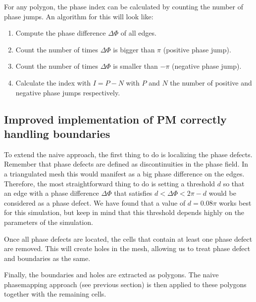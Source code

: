 \documentclass[twocolumn]{article}
\begin{document}
For any polygon, the phase index can be calculated by counting the
number of phase jumps. An algorithm for this will look like:

\begin{enumerate}
    \def\labelenumi{\arabic{enumi}.}
    \tightlist
  \item
    Compute the phase difference \(\Delta\Phi\) of all edges.
  \item
    Count the number of times \(\Delta\Phi\) is bigger than \(\pi\)
    (positive phase jump).
  \item
    Count the number of times \(\Delta\Phi\) is smaller than \(-\pi\)
    (negative phase jump).
  \item
    Calculate the index with \(I = P - N\) with \(P\) and \(N\) the number
    of positive and negative phase jumps respectively.
\end{enumerate}

\subsection{Improved implementation of PM correctly handling boundaries}

To extend the naive approach, the first thing to do is localizing the
phase defects. Remember that phase defects are defined as
discontinuities in the phase field. In a triangulated mesh this would
manifest as a big phase difference on the edges. Therefore, the most
straightforward thing to do is setting a threshold \(d\) so that an edge
with a phase difference \(\Delta\Phi\) that satisfies
\(d<\Delta\Phi<2\pi-d\) would be considered as a phase defect. We have
found that a value of \(d=0.08\pi\) works best for this simulation, but
keep in mind that this threshold depends highly on the parameters of the
simulation.

Once all phase defects are located, the cells that contain at least one
phase defect are removed. This will create holes in the mesh, allowing
us to treat phase defect and boundaries as the same.

Finally, the boundaries and holes are extracted as polygons. The naive
phasemapping approach (see previous section) is then applied to these
polygons together with the remaining cells.
\end{document}
